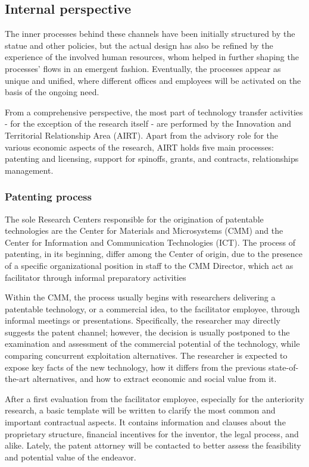 \subsection{Internal perspective}

The inner processes behind these channels have been initially structured by the statue and other policies, but the actual design has also be refined by the experience of the involved human resources, whom helped in further shaping the processes' flows in an emergent fashion. Eventually, the processes appear as unique and unified, where different offices and employees will be activated on the basis of the ongoing need. 

From a comprehensive perspective, the most part of technology transfer activities - for the exception of the research itself - are performed by the Innovation and Territorial Relationship Area (AIRT). Apart from the advisory role for the various economic aspects of the research, AIRT holds five main processes: patenting and licensing, support for spinoffs, grants, and contracts, relationships management.

\subsubsection{Patenting process}

The sole Research Centers responsible for the origination of patentable technologies are the Center for Materials and Microsystems (CMM) and the Center for Information and Communication Technologies (ICT). The process of patenting, in its beginning, differ among the Center of origin, due to the presence of a specific organizational position in staff to the CMM Director, which act as facilitator through informal preparatory activities

Within the CMM, the process usually begins with researchers delivering a patentable technology, or a commercial idea, to the facilitator employee, through informal meetings or presentations. Specifically, the researcher may directly suggests the patent channel; however, the decision is usually postponed to the examination and assessment of the commercial potential of the technology, while comparing concurrent exploitation alternatives. The researcher is expected to expose key facts of the new technology, how it differs from the previous state-of-the-art alternatives, and how to extract economic and social value from it. 

After a first evaluation from the facilitator employee, especially for the anteriority research, a basic template will be written to clarify the most common and important contractual aspects. It contains information and clauses about the proprietary structure, financial incentives for the inventor, the legal process, and alike. Lately, the patent attorney will be contacted to better assess the feasibility and potential value of the endeavor. 

